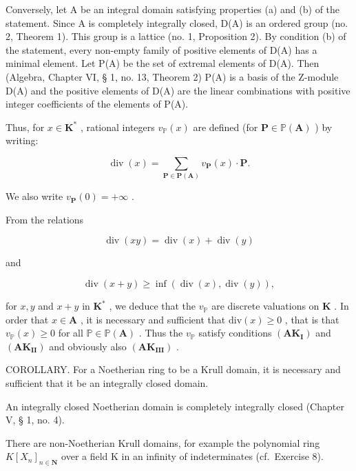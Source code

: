 Conversely, let A be an integral domain satisfying properties (a) and (b) of the statement. Since A is completely integrally closed, D(A) is an ordered group (no. 2, Theorem 1). This group is a lattice (no. 1, Proposition 2). By condition (b) of the statement, every non-empty family of positive elements of D(A) has a minimal element. Let P(A) be the set of extremal elements of D(A). Then (Algebra, Chapter VI, § 1, no. 13, Theorem 2) P(A) is a basis of the Z-module D(A) and the positive elements of D(A) are the linear combinations with positive integer coefficients of the elements of P(A).
 
Thus, for \(x \in \mathbf{K}^*\) , rational integers \(v_{\mathbb{P}}(x)\) are defined (for \(\mathbf{P} \in \mathbb{P}(\mathbf{A})\) ) by writing:

\[
\operatorname{div} (x) = \sum_ {\mathbf {P} \in \mathbf {P} (\mathbf {A})} v _ {\mathbf {P}} (x) \cdot \mathbf {P}.\tag{4}
\]

We also write \(v_{\mathbf{P}}(0) = +\infty\) .

From the relations

\[
\operatorname{div} (x y) = \operatorname{div} (x) + \operatorname{div} (y)
\]

and

\[
\operatorname{div} (x + y) \geqslant \inf (\operatorname{div} (x), \operatorname{div} (y)),
\]

for \(x, y\) and \(x + y\) in \(\mathbf{K}^*\) , we deduce that the \(v_{\mathbb{P}}\) are discrete valuations on \(\mathbf{K}\) . In order that \(x \in \mathbf{A}\) , it is necessary and sufficient that \(\mathrm{div}(x) \geqslant 0\) , that is that \(v_{\mathbb{P}}(x) \geqslant 0\) for all \(\mathbb{P} \in \mathbb{P}(\mathbf{A})\) . Thus the \(v_{\mathbb{P}}\) satisfy conditions \((\mathbf{AK}_{\mathbf{I}})\) and \((\mathbf{AK}_{\mathbf{II}})\) and obviously also \((\mathbf{AK}_{\mathbf{III}})\) .

COROLLARY. For a Noetherian ring to be a Krull domain, it is necessary and sufficient that it be an integrally closed domain.

An integrally closed Noetherian domain is completely integrally closed (Chapter V, § 1, no. 4).

There are non-Noetherian Krull domains, for example the polynomial ring \(K[X_{n}]_{n\in\mathbf{N}}\) over a field K in an infinity of indeterminates (cf.~Exercise 8).

